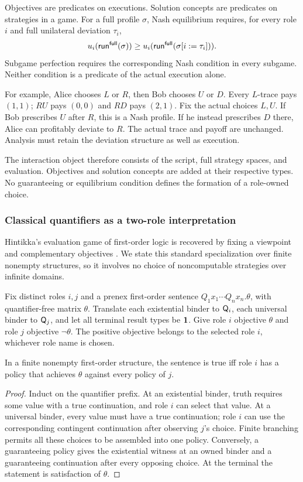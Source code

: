 Objectives are predicates on executions. Solution concepts are predicates
on strategies in a game. For a full profile $\sigma$, Nash equilibrium
requires, for every role $i$ and full unilateral deviation $\tau_i$,
\[
 u_i(\mathsf{run}^{\mathsf{full}}(\sigma))\ge
 u_i(\mathsf{run}^{\mathsf{full}}(\sigma[i:=\tau_i])).
\]
Subgame perfection requires the corresponding Nash condition in every
subgame. Neither condition is a predicate of the actual execution alone.

For example, Alice chooses $L$ or $R$, then Bob chooses $U$ or $D$.
Every $L$-trace pays $(1,1)$; $RU$ pays $(0,0)$ and $RD$ pays $(2,1)$.
Fix the actual choices $L,U$. If Bob prescribes $U$ after $R$, this is a
Nash profile. If he instead prescribes $D$ there, Alice can profitably
deviate to $R$. The actual trace and payoff are unchanged. Analysis must
retain the deviation structure as well as execution.

The interaction object therefore consists of the script, full strategy
spaces, and evaluation. Objectives and solution concepts are added at their
respective types. No guaranteeing or equilibrium condition defines the
formation of a role-owned choice.

\subsubsection{Classical quantifiers as a two-role interpretation}

Hintikka's evaluation game of first-order logic is recovered by fixing
a viewpoint and complementary objectives \cite{Hintikka1973}. We state this standard
specialization over finite nonempty structures, so it involves no choice of
noncomputable strategies over infinite domains.

Fix distinct roles $i,j$ and a prenex first-order sentence
$Q_1x_1\cdots Q_nx_n.\theta$, with quantifier-free matrix $\theta$.
Translate each existential binder to $\mathsf Q_i$, each universal binder to
$\mathsf Q_j$, and let all terminal result types be $\mathbf 1$. Give role $i$ objective
$\theta$ and role $j$ objective $\neg\theta$. The positive objective belongs
to the selected role $i$, whichever role name is chosen.

\begin{proposition}
In a finite nonempty first-order structure, the sentence is true iff role
$i$ has a policy that achieves $\theta$ against every policy of $j$.
\end{proposition}
\begin{proof}
Induct on the quantifier prefix. At an existential binder, truth requires
some value with a true continuation, and role $i$ can select that value.
At a universal binder, every value must have a true continuation; role $i$
can use the corresponding contingent continuation after observing $j$'s
choice. Finite branching permits all these choices to be assembled into
one policy. Conversely, a guaranteeing policy gives the existential witness
at an owned binder and a guaranteeing continuation after every opposing
choice. At the terminal the statement is satisfaction of $\theta$.
\end{proof}

